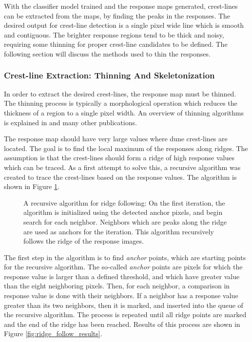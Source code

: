 With the classifier model trained and the response maps generated, crest-lines can be extracted from the maps, by finding the peaks in the responses. The desired output for crest-line detection is a single pixel wide line which is smooth and contiguous. The brighter response regions tend to be thick and noisy, requiring some thinning for proper crest-line candidates to be defined. The following section will discuss the methods used to thin the responses.

\subsubsection{Crest-line Extraction: Thinning And Skeletonization}

In order to extract the desired crest-lines, the response map must be thinned. The thinning process is typically a morphological operation which reduces the thickness of a region to a single pixel width. An overview of thinning algorithms is explained in \cite{thinning-algorithms,performance-characterization-thinning,susan-new-approach-low-level-image-processing} and many other publications.

The response map should have very large values where dune crest-lines are located. The goal is to find the local maximum of the responses along ridges. The assumption is that the crest-lines should form a ridge of high response values which can be traced. As a first attempt to solve this, a recursive algorithm was created to trace the crest-lines based on the response values. The algorithm is shown in Figure \ref{fig:recursive_ridge_follow}.

\begin{figure}
	\centering
	\caption{A recursive algorithm for ridge following: On the first iteration, the algorithm is initialized using the detected anchor pixels, and begin search for each neighbor. Neighbors which are peaks along the ridge are used as anchors for the iteration. This algorithm recursively follows the ridge of the response images.}
	\label{fig:recursive_ridge_follow}
\end{figure}

The first step in the algorithm is to find \emph{anchor} points, which are starting points for the recursive algorithm. The so-called \emph{anchor} points are pixels for which the response value is larger than a defined threshold, and which have greater value than the eight neighboring pixels. Then, for each neighbor, a comparison in response value is done with their neighbors. If a neighbor has a response value greater than its two neighbors, then it is marked, and inserted into the queue of the recursive algorithm. The process is repeated until all ridge points are marked and the end of the ridge has been reached. Results of this process are shown in Figure \ref{fig:ridge_follow_results}.

